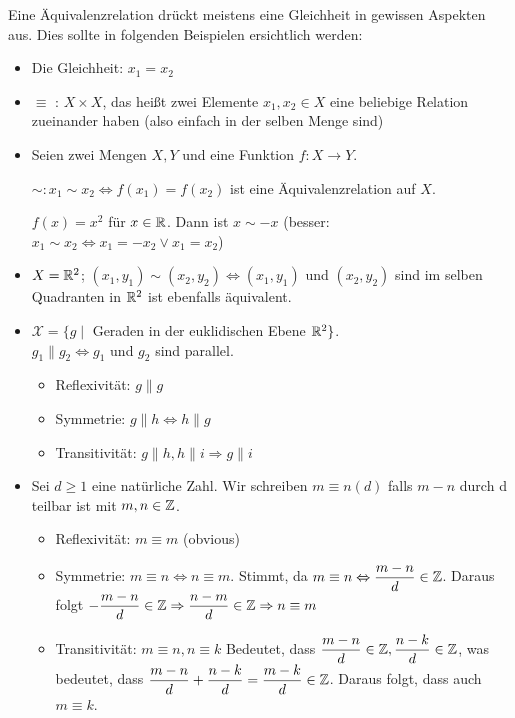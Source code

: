 \documentclass[main.tex]{subfiles}
\begin{document}
\begin{Beispiel}[Äquivalenzrelationen]
  Eine Äquivalenzrelation drückt meistens eine Gleichheit in gewissen Aspekten aus. Dies sollte in folgenden Beispielen ersichtlich werden:
  \begin{itemize}
    \item Die Gleichheit: $x_1 = x_2$
    \item $\equiv$ : $X \times X$, das heißt zwei Elemente $x_1,x_2 \in X$ eine beliebige Relation zueinander haben (also einfach in der selben Menge sind)
    \item Seien zwei Mengen $X,Y$ und eine Funktion $f: X \to Y$.

     $\sim : x_1 \sim x_2 \Leftrightarrow f(x_1) = f(x_2)$ ist eine Äquivalenzrelation auf $X$.
    \begin{Beispiel}
      $f(x)=x^2$ für $x \in \mathbb{R}$. Dann ist $x \sim -x$ (besser: $x_1 \sim x_2 \Leftrightarrow x_1 = - x_2 \lor x_1 = x_2 $)
    \end{Beispiel}
    \item $X=\mathbb{R}^2$; $(x_1,y_1)\sim (x_2,y_2) \Leftrightarrow (x_1,y_1)$ und $(x_2,y_2)$ sind im selben Quadranten in $\mathbb{R}^2$ ist ebenfalls äquivalent.
    \item $\mathcal{X} = \{ g \mid $ Geraden in der euklidischen Ebene $\mathbb{R}^2 \}$.\\
    $g_1 \parallel g_2 \Leftrightarrow g_1$ und $g_2$ sind parallel.
    \begin{itemize}
      \item Reflexivität: $g \parallel g$
      \item Symmetrie: $g \parallel h \Leftrightarrow h \parallel g$
      \item Transitivität: $g \parallel h, h\parallel i \Rightarrow g \parallel i$
    \end{itemize}
    \item Sei $d\geq 1$ eine natürliche Zahl. Wir schreiben $m \equiv n (d)$ falls $m-n$ durch d teilbar ist mit $m,n \in \mathbb{Z}$.
    \begin{itemize}
      \item Reflexivität: $m \equiv m$ (obvious)
      \item Symmetrie: $m \equiv n \Leftrightarrow n \equiv m$. Stimmt, da $m \equiv n \Leftrightarrow \dfrac{m-n}{d} \in \mathbb{Z}$. Daraus folgt $-\dfrac{m-n}{d} \in \mathbb{Z} \Rightarrow \dfrac{n-m}{d} \in \mathbb{Z} \Rightarrow n \equiv m$
      \item Transitivität: $m\equiv n, n \equiv k$ Bedeutet, dass $\dfrac{m-n}{d} \in \mathbb{Z}, \dfrac{n-k}{d} \in \mathbb{Z}$, was bedeutet, dass $\dfrac{m-n}{d} + \dfrac{n-k}{d} = \dfrac{m-k}{d} \in \mathbb{Z}$. Daraus folgt, dass auch $m \equiv k$.

\end{itemize}
\end{itemize}
\end{Beispiel}
\end{document}
